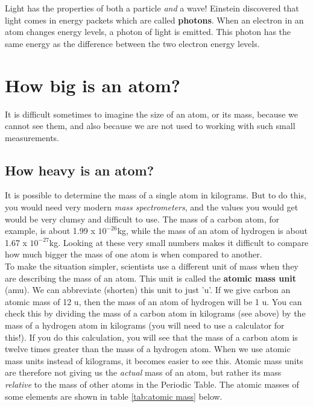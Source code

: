 \begin{IFact}{Light has the properties of both a particle \emph{and} a wave! Einstein discovered
that light comes in energy packets which are called \textbf{photons}. When an electron in an atom 
changes energy levels, a photon of light is emitted. This photon has the same energy as 
the difference between the two electron energy levels.}
\end{IFact}







\section{How big is an atom?}
\label{sec:atom:massdiam}

It is difficult sometimes to imagine the size of an atom, or its mass, because we cannot see them, and also because we are not used to working with such small measurements.

\subsection{How heavy is an atom?}

It is possible to determine the mass of a single atom in kilograms. But to do this, you would need very modern \textit{mass spectrometers}, and the values you would get would be very clumsy and difficult to use. The mass of a carbon atom, for example, is about 1.99 x $10^{-26}$kg, while the mass of an atom of hydrogen is about 1.67 x $10^{-27}$kg. Looking at these very small numbers makes it difficult to compare how much bigger the mass of one atom is when compared to another.\\

To make the situation simpler, scientists use a different unit of mass when they are describing the mass of an atom. This unit is called the \textbf{atomic mass unit} (amu). We can abbreviate (shorten) this unit to just 'u'. If we give carbon an atomic mass of 12 u, then the mass of an atom of hydrogen will be 1 u. You can check this by dividing the mass of a carbon atom in kilograms (see above) by the mass of a hydrogen atom in kilograms (you will need to use a calculator for this!). If you do this calculation, you will see that the mass of a carbon atom is twelve times greater than the mass of a hydrogen atom. When we use atomic mass units instead of kilograms, it becomes easier to see this. Atomic mass units are therefore not giving us the \textit{actual} mass of an atom, but rather its mass \textit{relative} to the mass of other atoms in the Periodic Table. The atomic masses of some elements are shown in table \ref{tab:atomic mass} below.\\


